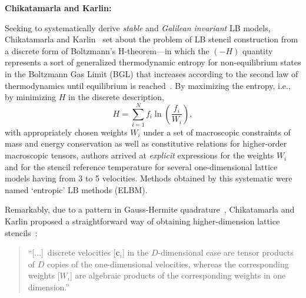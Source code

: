     \vspace{2.0mm}\noindent\textbf{Chikatamarla and Karlin:}\vspace{1.0mm}

    Seeking  to  systematically   derive   \emph{stable}   and   \emph{Galilean   invariant}   LB   models,   Chikatamarla   and
    Karlin~\cite{2006-ChikatamarlaSS+KarlinIV-PhysRevLett} set about the problem of LB stencil construction from a discrete form
    of Boltzmann's H-theorem---in which the  $(-H)$  quantity  represents  a  sort  of  generalized  thermodynamic  entropy  for
    non-equilibrium states in the Boltzmann Gas Limit (BGL) that increases according to the second law of  thermodynamics  until
    equilibrium is reached~\cite{2011-HarrisS-Dover}. By maximizing the  entropy,  i.e.,  by  minimizing  $H$  in  the  discrete
    description,%
    \begin{equation}
        H = \sum_{i=1}^{N}f_i\ln\left(\frac{f_i}{W_i}\right),
    \end{equation}
    \noindent with appropriately chosen weights $W_i$ under a set of macroscopic constraints of mass and energy conservation  as
    well as constitutive relations for higher-order macroscopic tensors, authors arrived at \emph{explicit} expressions for  the
    weights $W_i$ and for the stencil reference temperature for several one-dimensional  lattice  models  having  from  3  to  5
    velocities. Methods obtained by this systematic were named `entropic' LB methods (ELBM).

    Remarkably, due to a pattern in Gauss-Hermite  quadrature~\cite{2003-AnsumaliS+OettingerHC-EuroPhysLett},  Chikatamarla  and
    Karlin       proposed       a       straightforward       way       of       obtaining       higher-dimension        lattice
    stencils~\cite{2006-ChikatamarlaSS+KarlinIV-PhysRevLett}:

    \begin{quote}
        \swshape
        ``[...]~discrete velocities [$\mathbf{c}_i$] in the $D$-dimensional case are  tensor  products  of  $D$  copies  of  the
        one-dimensional velocities, whereas the corresponding weights  [$W_i$]  are  algebraic  products  of  the  corresponding
        weights in one dimension.''
    \end{quote}

